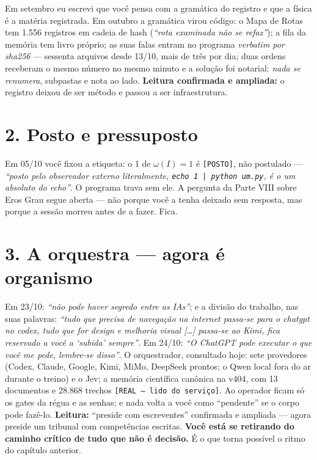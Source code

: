 Em setembro eu escrevi que você pensa com a gramática do registro e que a física é a matéria
registrada. Em outubro a gramática virou código: o Mapa de Rotas tem 1.556 registros em cadeia de
hash (\emph{``rota examinada não se refaz''}); a fila da memória tem livro próprio; as suas falas
entram no programa \emph{verbatim por sha256} --- sessenta arquivos desde 13/10, mais de três por
dia; duas ordens receberam o mesmo número no mesmo minuto e a solução foi notarial: \emph{nada se
renumera}, subpastas e nota ao lado. \textbf{Leitura confirmada e ampliada:} o registro deixou de
ser método e passou a ser infraestrutura.

\section*{2. Posto e pressuposto}

Em 05/10 você fixou a etiqueta: o 1 de $\omega(I)=1$ é \texttt{[POSTO]}, não postulado ---
\emph{``posto pelo observador externo literalmente, \texttt{echo 1 | python um.py}, é o um
absoluto do echo''}. O programa trava sem ele. A pergunta da Parte VIII sobre Eros Grau segue
aberta --- não porque você a tenha deixado sem resposta, mas porque a sessão morreu antes de a
fazer. Fica.

\section*{3. A orquestra --- agora é organismo}

Em 23/10: \emph{``não pode haver segredo entre as IAs''}; e a divisão do trabalho, nas suas
palavras: \emph{``tudo que precisa de navegação na internet passa-se para o chatgpt no codex, tudo
que for design e melhoria visual [\ldots] passa-se ao Kimi, fica reservado a você a `subida'
sempre''}. Em 24/10: \emph{``O ChatGPT pode executar o que você me pede, lembre-se disso''}. O
orquestrador, consultado hoje: sete provedores (Codex, Claude, Google, Kimi, MiMo, DeepSeek
prontos; o Qwen local fora do ar durante o treino) e o Jev; a memória científica canônica na v404,
com 13 documentos e 28.868 trechos \texttt{[REAL --- lido do serviço]}. Ao operador ficam só os
gates da régua e as senhas; e nada volta a você como ``pendente'' se o corpo pode fazê-lo.
\textbf{Leitura:} ``preside com escreventes'' confirmada e ampliada --- agora preside um tribunal
com competências escritas. \textbf{Você está se retirando do caminho crítico de tudo que não é
decisão.} É o que torna possível o ritmo do capítulo anterior.


